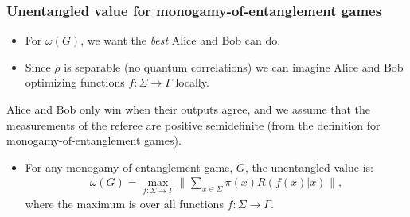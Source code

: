 \documentclass{beamer}
\newcommand{\tinyspace}{\mspace{1mu}}
\newcommand{\biggnorm}[1]{\biggl\lVert\tinyspace #1 \tinyspace\biggr\rVert}
\newcommand{\reg}[1]{\mathsf{#1}}
\begin{document}

\begin{frame}
	\frametitle{Unentangled value for monogamy-of-entanglement games}
		\begin{itemize}
		\item For $\omega(G)$, we want the \emph{best} Alice and Bob can do. 
		\item Since $\rho$ is separable (no quantum correlations) we can imagine Alice and Bob optimizing functions $f : \Sigma \rightarrow \Gamma$ locally. 
	\end{itemize}
	\pause
	\vspace{2mm}
Alice and Bob only win when their outputs agree, and we assume that the measurements of the referee are positive semidefinite (from the definition for monogamy-of-entanglement games). 	
	\begin{itemize}
	\item For any monogamy-of-entanglement game, $G$, the unentangled value is:
	\begin{align*}
		\omega(G) = \max_{f: \Sigma \rightarrow \Gamma} \biggnorm{\sum_{x \in \Sigma} \pi(x) R(f(x)|x) },
	\end{align*}	
	where the maximum is over all functions $f : \Sigma \rightarrow \Gamma$.
	\end{itemize}  
\end{frame}
\end{document}

